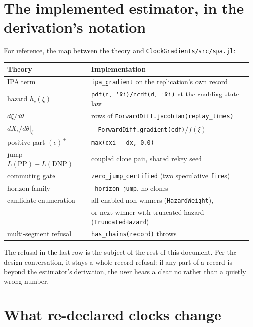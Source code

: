 \documentclass[11pt]{article}
\newcommand{\code}[1]{\texttt{#1}}
\begin{document}
\section{The implemented estimator, in the derivation's notation}

For reference, the map between the theory and \code{ClockGradients/src/spa.jl}:

\begin{center}
\small
\begin{tabular}{@{}ll@{}}
\toprule
Theory & Implementation \\
\midrule
IPA term & \code{ipa\_gradient} on the replication's own record \\
hazard $h_e(\xi)$ & \code{pdf(d,\,\char`\~xi)/ccdf(d,\,\char`\~xi)} at the enabling-state law \\
$d\xi/d\theta$ & rows of \code{ForwardDiff.jacobian(replay\_times)} \\
$dX_e/d\theta|_\xi$ & $-\,$\code{ForwardDiff.gradient(cdf)}$/f(\xi)$ \\
positive part $(v)^+$ & \code{max(dxi - dx, 0.0)} \\
jump $L(\mathrm{PP})-L(\mathrm{DNP})$ & coupled clone pair, shared rekey seed \\
commuting gate & \code{zero\_jump\_certified} (two speculative \code{fire}s) \\
horizon family & \code{\_horizon\_jump}, no clones \\
candidate enumeration & all enabled non-winners (\code{HazardWeight}), \\
& or next winner with truncated hazard (\code{TruncatedHazard}) \\
multi-segment refusal & \code{has\_chains(record)} throws \\
\bottomrule
\end{tabular}
\end{center}

The refusal in the last row is the subject of the rest of this document.
Per the design conversation, it stays a whole-record refusal: if any part
of a record is beyond the estimator's derivation, the user hears a clear
no rather than a quietly wrong number.

\section{What re-declared clocks change}
\end{document}
